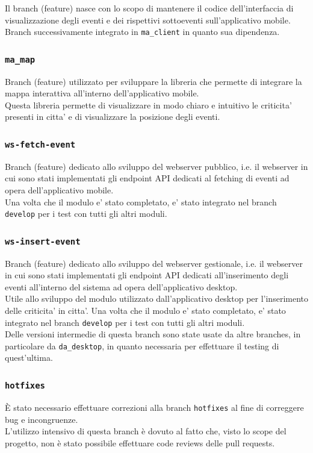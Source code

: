 \documentclass{article}
\begin{document}
Il branch (feature) nasce con lo scopo di mantenere il codice dell'interfaccia di visualizzazione degli eventi e dei rispettivi sottoeventi sull'applicativo mobile.
Branch successivamente integrato in \texttt{ma\_client} in quanto sua dipendenza.

\subsubsection{\texttt{ma\_map}}

Branch (feature) utilizzato per sviluppare la libreria che permette di integrare la mappa interattiva all'interno dell'applicativo mobile.\\
Questa libreria permette di visualizzare in modo chiaro e intuitivo le criticita' presenti in citta' e di visualizzare la posizione degli eventi.

\subsubsection{\texttt{ws-fetch-event}}

Branch (feature) dedicato allo sviluppo del webserver pubblico, i.e. il webserver in cui sono stati implementati gli endpoint API dedicati al fetching di eventi ad opera dell'applicativo mobile.\\
Una volta che il modulo e' stato completato, e' stato integrato nel branch \texttt{develop} per i test con tutti gli altri moduli.

\subsubsection{\texttt{ws-insert-event}}

Branch (feature) dedicato allo sviluppo del webserver gestionale, i.e. il webserver in cui sono stati implementati gli endpoint API dedicati all'inserimento degli eventi all'interno del sistema ad opera dell'applicativo desktop. \\
Utile allo sviluppo del modulo utilizzato dall'applicativo desktop per l'inserimento delle criticita' in citta'.
Una volta che il modulo e' stato completato, e' stato integrato nel branch \texttt{develop} per i test con tutti gli altri moduli.\\
Delle versioni intermedie di questa branch sono state usate da altre branches, in particolare da \texttt{da\_desktop}, in quanto necessaria per effettuare il testing di quest'ultima.

\subsubsection{\texttt{hotfixes}}
È stato necessario effettuare correzioni alla branch \texttt{hotfixes} al fine di correggere bug e incongruenze.\\
L'utilizzo intensivo di questa branch è dovuto al fatto che, visto lo scope del progetto, non è stato possibile effettuare code reviews delle pull requests.
\end{document}
